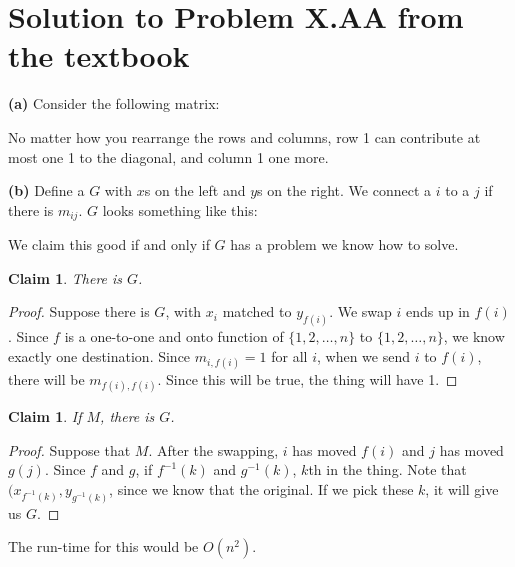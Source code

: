 \documentclass[11pt]{article}
\newtheorem{claim}[theorem]{Claim}
\begin{document}
\section*{Solution to Problem X.AA from the textbook}

\textbf{(a)} Consider the following matrix:


No matter how you rearrange the rows and columns, row 1 can contribute at most one 1 to the diagonal, and column 1 one more.

\textbf{(b)}
Define a $G$ with $x$s on the left and $y$s on the right. We connect a $i$ to a $j$ if there is $m_{ij}$. $G$ looks something like this:


We claim this good if and only if $G$ has a problem we know how to solve.
\begin{claim} 
There is $G$. 
\end{claim}
\begin{proof}
Suppose there is $G$, with $x_{i}$ matched to $y_{f(i)}$. We swap $i$ ends up in $f(i)$. Since $f$ is a one-to-one and onto function of $\{1,2,\ldots,n\}$ to $\{1,2,\ldots,n\}$, we know exactly one destination. Since $m_{i,f(i)} = 1$ for all $i$, when we send $i$ to $f(i)$, there will be $m_{f(i),f(i)}$. Since this will be true, the thing will have 1.
\end{proof}
\begin{claim} 
If $M$, there is $G$. 
\end{claim}
\begin{proof}
Suppose that $M$. After the swapping, $i$ has moved $f(i)$ and $j$ has moved $g(j)$. Since $f$ and $g$, if $f^{-1}(k)$ and $g^{-1}(k)$, $k$th in the thing. Note that $(x_{f^{-1}(k)}, y_{g^{-1}(k)}$, since we know that the original. If we pick these $k$, it will give us $G$. 
\end{proof}

The run-time for this would be $O(n^2)$.
\end{document}
